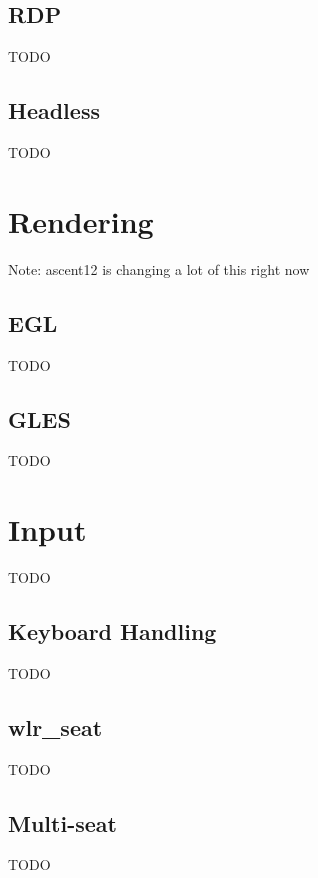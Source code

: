 \documentclass{article}
\begin{document}
\subsection{RDP}\label{rdp backend}

TODO

\subsection{Headless}\label{headless backend}

TODO

\newpage
\section{Rendering}\label{rendering}

Note: ascent12 is changing a lot of this right now

\subsection{EGL}

TODO

\subsection{GLES}

TODO

\newpage
\section{Input}\label{input}

TODO

\subsection{Keyboard Handling}\label{keyboard handling}

TODO

\subsection{wlr_seat}\label{wlr seat summary}

TODO

\subsection{Multi-seat}\label{multi seat}

TODO
\end{document}
